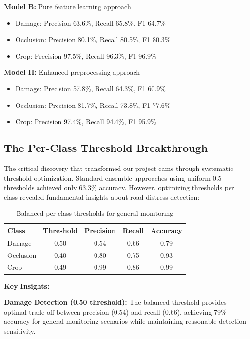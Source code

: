 \documentclass[12pt]{article}
\begin{document}
\noindent\textbf{Model B:} Pure feature learning approach
\begin{itemize}[itemsep=1pt,parsep=0pt,topsep=2pt]
\item Damage: Precision 63.6\%, Recall 65.8\%, F1 64.7\%
\item Occlusion: Precision 80.1\%, Recall 80.5\%, F1 80.3\%
\item Crop: Precision 97.5\%, Recall 96.3\%, F1 96.9\%
\end{itemize}

\noindent\textbf{Model H:} Enhanced preprocessing approach
\begin{itemize}[itemsep=1pt,parsep=0pt,topsep=2pt]
\item Damage: Precision 57.8\%, Recall 64.3\%, F1 60.9\%
\item Occlusion: Precision 81.7\%, Recall 73.8\%, F1 77.6\%
\item Crop: Precision 97.4\%, Recall 94.4\%, F1 95.9\%
\end{itemize}

\subsection{The Per-Class Threshold Breakthrough}

The critical discovery that transformed our project came through systematic threshold optimization. Standard ensemble approaches using uniform 0.5 thresholds achieved only 63.3\% accuracy. However, optimizing thresholds per class revealed fundamental insights about road distress detection:

\begin{table}[!h]
\centering
\begin{tabular}{lcccc}
\toprule
\textbf{Class} & \textbf{Threshold} & \textbf{Precision} & \textbf{Recall} & \textbf{Accuracy} \\
\midrule
Damage & 0.50 & 0.54 & 0.66 & 0.79 \\
Occlusion & 0.40 & 0.80 & 0.75 & 0.93 \\
Crop & 0.49 & 0.99 & 0.86 & 0.99 \\
\bottomrule
\end{tabular}
\caption{Balanced per-class thresholds for general monitoring}
\end{table}

\noindent\textbf{Key Insights:}

\textbf{Damage Detection (0.50 threshold):} The balanced threshold provides optimal trade-off between precision (0.54) and recall (0.66), achieving 79\% accuracy for general monitoring scenarios while maintaining reasonable detection sensitivity.
\end{document}
